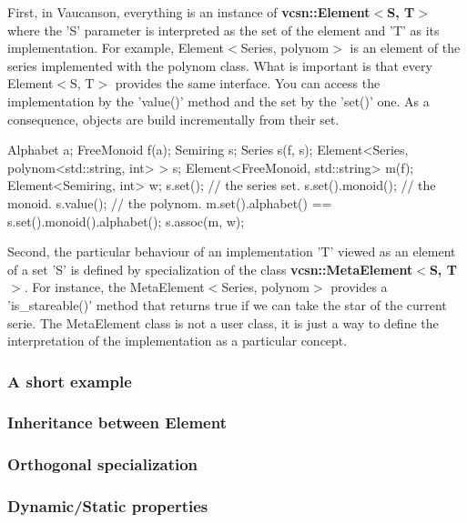 \documentclass{article}
\begin{document}
First, in Vaucanson, everything is an instance of
\textbf{vcsn::Element$<$S, T$>$} where the 'S' parameter is
interpreted as the set of the element and 'T' as its implementation.
For example, Element$<$Series, polynom$>$ is an element of the series
implemented with the polynom class. What is important is that every
Element$<$S, T$>$ provides the same interface. You can access the
implementation by the 'value()' method and the set by the 'set()' one.
As a consequence, objects are build incrementally from their set. 

\begin{code}
Alphabet a;
FreeMonoid f(a);
Semiring s;
Series s(f, s);
Element<Series, polynom<std::string, int> > s;
Element<FreeMonoid, std::string> m(f);
Element<Semiring, int>   w;
s.set();          // the series set.
s.set().monoid(); // the monoid.
s.value();        // the polynom.
m.set().alphabet() == s.set().monoid().alphabet();
s.assoc(m, w);
\end{code}

Second, the particular behaviour of an implementation 'T' viewed as an
element of a set 'S' is defined by specialization of the class
\textbf{vcsn::MetaElement$<$S, T$>$}. For instance, the
MetaElement$<$Series, polynom$>$ provides a 'is\_stareable()' method
that returns true if we can take the star of the current serie. The
MetaElement class is not a user class, it is just a way to define the
interpretation of the implementation as a particular concept. 



\subsubsection{A short example}

\subsubsection{Inheritance between Element}

\subsubsection{Orthogonal specialization}

\subsubsection{Dynamic/Static properties}
\end{document}
